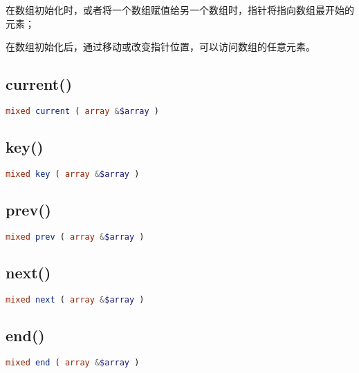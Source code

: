 \begin{compactitem}
\item 在数组初始化时，或者将一个数组赋值给另一个数组时，指针将指向数组最开始的元素；
\item 在数组初始化后，通过移动或改变指针位置，可以访问数组的任意元素。
\end{compactitem}

\subsection{current()}





\begin{lstlisting}[language=PHP]
mixed current ( array &$array )
\end{lstlisting}


\subsection{key()}


\begin{lstlisting}[language=PHP]
mixed key ( array &$array )
\end{lstlisting}


\subsection{prev()}




\begin{lstlisting}[language=PHP]
mixed prev ( array &$array )
\end{lstlisting}

\subsection{next()}



\begin{lstlisting}[language=PHP]
mixed next ( array &$array )
\end{lstlisting}


\subsection{end()}



\begin{lstlisting}[language=PHP]
mixed end ( array &$array )
\end{lstlisting}


